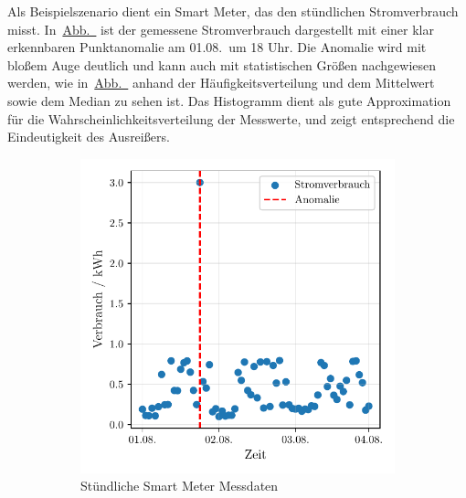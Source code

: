 Als Beispielszenario dient ein Smart Meter, das den stündlichen Stromverbrauch misst.
In~\hyperref[subfig:smartmeter]{Abb.~} ist der gemessene Stromverbrauch dargestellt mit einer klar
erkennbaren Punktanomalie am 01.08.~um 18 Uhr. Die Anomalie wird mit bloßem Auge deutlich und kann auch mit statistischen Größen
nachgewiesen werden, wie in~\hyperref[subfig:smartmeter_histogramm]{Abb.~} anhand der
Häufigkeitsverteilung und dem Mittelwert sowie dem Median zu sehen ist. Das Histogramm dient als gute Approximation für die
Wahrscheinlichkeitsverteilung der Messwerte, und zeigt entsprechend die Eindeutigkeit des Ausreißers.

\begin{figure}[!t]
    \centering
    \begin{subfigure}[b]{0.49\linewidth}
        \includegraphics[width=\linewidth]{ch5_anomalien/abbildungen/punktanomalie_bsp.pdf}
        \caption{Stündliche Smart Meter Messdaten}\label{subfig:smartmeter}
    \end{subfigure}
    \begin{subfigure}[b]{0.49\linewidth}

\end{subfigure}
\end{figure}
